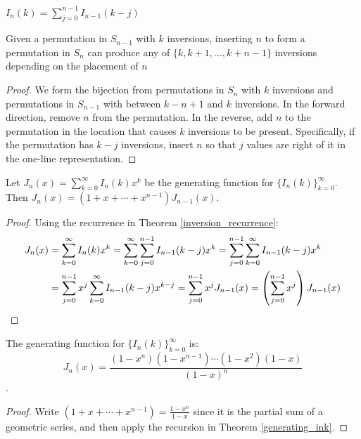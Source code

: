\documentclass[a4paper]{article}
\begin{document}
\begin{theorem}\label{inversion_recurrence}
$\displaystyle I_n(k)=\sum_{j=0}^{n-1}I_{n-1}(k-j)$
\begin{arrows}
\item Given a permutation in $S_{n-1}$ with $k$ inversions, inserting $n$ to form a permutation in $S_n$ can produce any of $\{k,k+1,\dots,k+n-1\}$ inversions depending on the placement of $n$
\end{arrows}
\begin{hl}
\begin{proof}
We form the bijection from permutations in $S_n$ with $k$ inversions and permutations in $S_{n-1}$ with between $k-n+1$ and $k$ inversions. In the forward direction, remove $n$ from the permutation. In the reverse, add $n$ to the permutation in the location that causes $k$ inversions to be present. Specifically, if the permutation has $k-j$ inversions, insert $n$ so that $j$ values are right of it in the one-line representation.
\end{proof}
\end{hl}
\end{theorem}

\begin{theorem}\label{generating_ink}
Let $J_n(x)=\sum_{k=0}^\infty I_n(k)x^k$ be the generating function for $\{I_n(k)\}_{k=0}^\infty$. Then $J_n(x)=(1+x+\cdots+x^{n-1})J_{n-1}(x)$.

\begin{hl}
\begin{proof}
Using the recurrence in Theorem \ref{inversion_recurrence}:
\begin{align*}
J_n(x)
&=\sum_{k=0}^\infty I_n(k)x^k
=\sum_{k=0}^\infty\sum_{j=0}^{n-1}I_{n-1}(k-j)x^k
=\sum_{j=0}^{n-1}\sum_{k=0}^\infty I_{n-1}(k-j)x^k\\
&=\sum_{j=0}^{n-1}x^j\sum_{k=0}^\infty I_{n-1}(k-j)x^{k-j}
=\sum_{j=0}^{n-1}x^jJ_{n-1}(x)
=\left(\sum_{j=0}^{n-1}x^j\right)J_{n-1}(x)\qedhere
\end{align*}
\end{proof}
\end{hl}
\end{theorem}

\begin{corollary}
The generating function for $\{I_n(k)\}_{k=0}^\infty$ is:
\begin{equation*}
J_n(x)=\frac{(1-x^n)(1-x^{n-1})\cdots(1-x^2)(1-x)}{(1-x)^n}
\end{equation*}.

\begin{hl}
\begin{proof}
Write $(1+x+\cdots+x^{n-1})=\frac{1-x^n}{1-x}$ since it is the partial sum of a geometric series, and then apply the recursion in Theorem \ref{generating_ink}.
\end{proof}
\end{hl}
\end{corollary}
\end{document}
